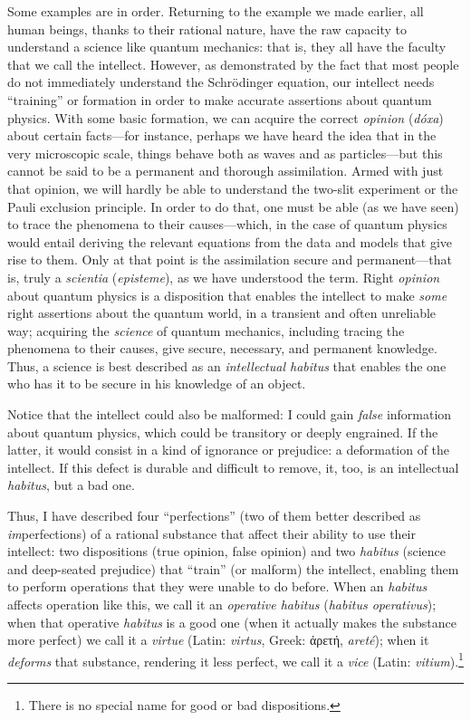 \documentclass[article,12pt,a4paper,oneside]{memoir}
\begin{document}
    Some examples are in order. Returning to the example we made
    earlier, all human beings, thanks to their rational nature, have the
    raw capacity to understand a science like quantum mechanics: that
    is, they all have the faculty that we call the intellect. However,
    as demonstrated by the fact that most people do not immediately
    understand the Schrödinger equation, our intellect needs
    ``training'' or formation in order to make accurate assertions about
    quantum physics. With some basic formation, we can acquire the
    correct \emph{opinion} (\emph{dóxa}) about certain facts---for
    instance, perhaps we have heard the idea that in the very
    microscopic scale, things behave both as waves and as
    particles---but this cannot be said to be a permanent and thorough
    assimilation. Armed with just that opinion, we will hardly be able
    to understand the two-slit experiment or the Pauli exclusion
    principle. In order to do that, one must be able (as we have seen)
    to trace the phenomena to their causes---which, in the case of
    quantum physics would entail deriving the relevant equations from
    the data and models that give rise to them. Only at that point is
    the assimilation secure and permanent---that is, truly a
    \emph{scientia} (\emph{episteme}), as we have understood the term.
    Right \emph{opinion} about quantum physics is a disposition that
    enables the intellect to make \emph{some} right assertions about the
    quantum world, in a transient and often unreliable way; acquiring
    the \emph{science} of quantum mechanics, including tracing the
    phenomena to their causes, give secure, necessary, and permanent
    knowledge. Thus, a science is best described as an
    \emph{intellectual habitus} that enables the one who has it to be
    secure in his knowledge of an object.

    Notice that the intellect could also be malformed: I could gain
    \emph{false} information about quantum physics, which could be
    transitory or deeply engrained. If the latter, it would consist in a
    kind of ignorance or prejudice: a deformation of the intellect. If
    this defect is durable and difficult to remove, it, too, is an
    intellectual \emph{habitus}, but a bad one.

    Thus, I have described four ``perfections'' (two of them better
    described as \emph{im}perfections) of a rational substance that
    affect their ability to use their intellect: two dispositions (true
    opinion, false opinion) and two \emph{habitus} (science and
    deep-seated prejudice) that ``train'' (or malform) the intellect,
    enabling them to perform operations that they were unable to do
    before. When an \emph{habitus} affects operation like this, we call
    it an \emph{operative habitus} (\emph{habitus operativus}); when
    that operative \emph{habitus} is a good one (when it actually makes
    the substance more perfect) we call it a \emph{virtue} (Latin:
    \emph{virtus}, Greek: ἀρετή, \emph{areté}); when it \emph{deforms}
    that substance, rendering it less perfect, we call it a \emph{vice}
    (Latin: \emph{vitium}).\footnote{There is no special name for good
      or bad dispositions.}
\end{document}
